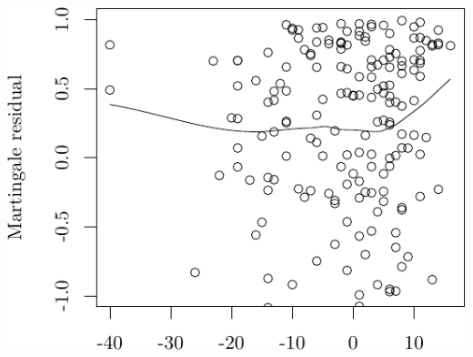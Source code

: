 \documentclass{article}\usepackage[]{graphicx}\usepackage[]{color}
\makeatletter
\def\maxwidth{ %
  \ifdim\Gin@nat@width>\linewidth
    \linewidth
  \else
    \Gin@nat@width
  \fi
}
\newenvironment{knitrout}{}{} %
\makeatother
\begin{document}
\begin{knitrout}
{\centering \includegraphics[width=\maxwidth]{figure/05-eda-func-form-age-2-2} 

}



\end{knitrout}
\end{document}
